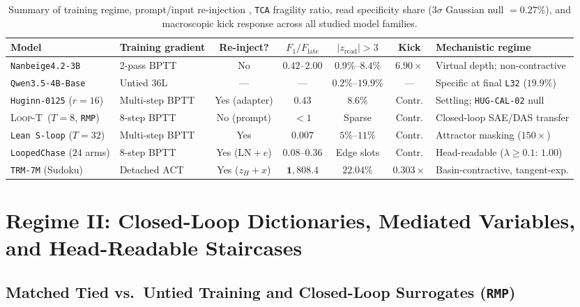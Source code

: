 \documentclass[10pt,letterpaper]{article}
\newcommand{\LoopT}{\textsc{Loop-T}}
\begin{document}
\begin{table}[t]
\centering
\small
\begin{tabularx}{\linewidth}{@{}llcccc>{\raggedright\arraybackslash}X@{}}
\toprule
Model & Training gradient & Re-inject? & $F_1 / F_{\mathrm{late}}$ & $|z_{\mathrm{read}}|{>}3$ & Kick & Mechanistic regime \\
\midrule
\texttt{Nanbeige4.2-3B} & 2-pass BPTT & No & $0.42$--$2.00$ & $0.9\%$--$8.4\%$ & $6.90\times$ & Virtual depth; non-contractive \\
\texttt{Qwen3.5-4B-Base} & Untied 36L & --- & --- & $0.2\%$--$19.9\%$ & --- & Specific at final \texttt{L32} ($19.9\%$) \\
\texttt{Huginn-0125} ($r{=}16$) & Multi-step BPTT & Yes (adapter) & $0.43$ & $8.6\%$ & Contr. & Settling; \texttt{HUG-CAL-02} null \\
\LoopT\ ($T{=}8$, \texttt{RMP}) & 8-step BPTT & No (prompt) & $< 1$ & Sparse & Contr. & Closed-loop SAE/DAS transfer \\
\texttt{Lean S-loop} ($T{=}32$) & Multi-step BPTT & Yes & $0.007$ & $5\%$--$11\%$ & Contr. & Attractor masking ($150\times$) \\
\texttt{LoopedChase} ($24$ arms) & 8-step BPTT & Yes ($\mathrm{LN}{+}e$) & $0.08$--$0.36$ & Edge slots & Contr. & Head-readable ($\lambda{\ge}0.1$: $1.00$) \\
\texttt{TRM-7M} (Sudoku) & Detached ACT & Yes ($z_H{+}x$) & $\mathbf{1{,}808.4}$ & $\mathbf{22.04\%}$ & $\mathbf{0.303\times}$ & Basin-contractive, tangent-exp. \\
\bottomrule
\end{tabularx}
\caption{Summary of training regime, prompt/input re-injection \cite{olszowiec2026monitoring}, \texttt{TCA} fragility ratio, read specificity share ($3\sigma$ Gaussian null $= 0.27\%$), and macroscopic kick response across all studied model families.}
\label{tab:tca_summary}
\end{table}

\section{Regime II: Closed-Loop Dictionaries, Mediated Variables, and Head-Readable Staircases}\label{sec:regime2}

\subsection{Matched Tied vs.\ Untied Training and Closed-Loop Surrogates (\texttt{RMP})}
\end{document}
